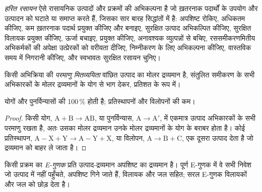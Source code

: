 \begin{definition}[हरित रसायन]\label{def:b3:green-industrial:green-chemistry}
\emph{हरित रसायन} ऐसे रासायनिक
उत्पादों और प्रक्रमों की अभिकल्पना है जो ख़तरनाक पदार्थों के उपयोग और उत्पादन को
घटाते या समाप्त करते हैं, जिसका सार बारह सिद्धांतों में है: अपशिष्ट रोकिए,  अधिकतम कीजिए, कम ख़तरनाक पदार्थ प्रयुक्त कीजिए और बनाइए, सुरक्षित उत्पाद अभिकल्पित कीजिए,
सुरक्षित विलायक प्रयुक्त कीजिए, ऊर्जा बचाइए,  प्रयुक्त कीजिए, अनावश्यक
व्युत्पन्नों से बचिए, रससमीकरणमितीय अभिकर्मकों की अपेक्षा उत्प्रेरकों को वरीयता दीजिए, निम्नीकरण के लिए
अभिकल्पना कीजिए, वास्तविक समय में निगरानी कीजिए, और स्वभावतः सुरक्षित रसायन चुनिए।
\end{definition}

\begin{definition}[परमाणु मितव्ययिता]\label{def:b3:green-industrial:atom-economy}
किसी अभिक्रिया की \emph{परमाणु मितव्ययिता} वांछित उत्पाद का
मोलर द्रव्यमान है, संतुलित समीकरण के सभी अभिकारकों के मोलर द्रव्यमानों के
योग से भाग देकर, प्रतिशत के रूप में।
\end{definition}

\begin{proposition}[अभिक्रिया-वर्ग के अनुसार परमाणु मितव्ययिता]\label{prop:b3:green-industrial:ae-classes}
योगों और पुनर्विन्यासों की  100\,\% होती है; प्रतिस्थापनों और
विलोपनों की कम।
\end{proposition}

\begin{proof}
किसी योग, $\mathrm{A} + \mathrm{B} \to \mathrm{AB}$, या पुनर्विन्यास, $\mathrm{A} \to \mathrm{A'}$, में एकमात्र उत्पाद अभिकारकों के सभी
परमाणु रखता है, अतः उसका मोलर द्रव्यमान उनके मोलर द्रव्यमानों के योग के बराबर होता है। कोई
प्रतिस्थापन, $\mathrm{A{-}X} + \mathrm{Y} \to \mathrm{A{-}Y} + \mathrm{X}$, या विलोपन, $\mathrm{A} \to \mathrm{B} + \mathrm{C}$, एक
दूसरा उत्पाद देता है जो द्रव्यमान को बाहर ले जाता है।
\end{proof}

\begin{definition}[E-गुणक]\label{def:b3:green-industrial:e-factor}
किसी प्रक्रम का \emph{E-गुणक} प्रति उत्पाद-द्रव्यमान अपशिष्ट का
द्रव्यमान है। पूर्ण E-गुणक में वे सभी निवेश जो उत्पाद में नहीं पहुँचते, अपशिष्ट
गिने जाते हैं, विलायक और जल सहित; सरल E-गुणक विलायकों और
जल को छोड़ देता है।
\end{definition}

